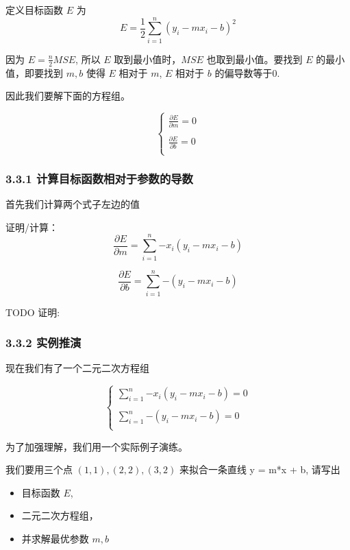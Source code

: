 \documentclass[11pt]{article}
\providecommand{\tightlist}{%
      \setlength{\itemsep}{0pt}\setlength{\parskip}{0pt}}
\begin{document}
定义目标函数 \(E\) 为 \[
E = \frac{1}{2}\sum_{i=1}^{n}{(y_i - mx_i - b)^2}
\]

因为 \(E = \frac{n}{2}MSE\), 所以 \(E\) 取到最小值时，\(MSE\)
也取到最小值。要找到 \(E\) 的最小值，即要找到 \(m, b\) 使得 \(E\) 相对于
\(m\), \(E\) 相对于 \(b\) 的偏导数等于0.

因此我们要解下面的方程组。

\[
\begin{cases}
\displaystyle
\frac{\partial E}{\partial m} =0 \\
\\
\displaystyle
\frac{\partial E}{\partial b} =0 \\
\end{cases}
\]

\subsubsection{3.3.1
计算目标函数相对于参数的导数}\label{ux8ba1ux7b97ux76eeux6807ux51fdux6570ux76f8ux5bf9ux4e8eux53c2ux6570ux7684ux5bfcux6570}

首先我们计算两个式子左边的值

证明/计算： \[
\frac{\partial E}{\partial m} = \sum_{i=1}^{n}{-x_i(y_i - mx_i - b)}
\]

\[
\frac{\partial E}{\partial b} = \sum_{i=1}^{n}{-(y_i - mx_i - b)}
\]

    TODO 证明:

    \subsubsection{3.3.2 实例推演}\label{ux5b9eux4f8bux63a8ux6f14}

现在我们有了一个二元二次方程组

\[
\begin{cases}
\displaystyle
\sum_{i=1}^{n}{-x_i(y_i - mx_i - b)} =0 \\
\\
\displaystyle
\sum_{i=1}^{n}{-(y_i - mx_i - b)} =0 \\
\end{cases}
\]

为了加强理解，我们用一个实际例子演练。

我们要用三个点 \((1,1), (2,2), (3,2)\) 来拟合一条直线 y = m*x + b,
请写出

\begin{itemize}
\tightlist
\item
  目标函数 \(E\),
\item
  二元二次方程组，
\item
  并求解最优参数 \(m, b\)
\end{itemize}
\end{document}
